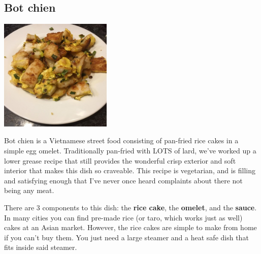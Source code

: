 \documentclass[
]{book}
\begin{document}
\hypertarget{botchien}{%
\subsection*{Bot chien}\label{botchien}}

\includegraphics[width=0.4\textwidth,height=\textheight]{bot_chien_small.jpg}

Bot chien is a Vietnamese street food consisting of pan-fried rice cakes in a simple egg omelet. Traditionally pan-fried with LOTS of lard, we've worked up a lower grease recipe that still provides the wonderful crisp exterior and soft interior that makes this dish so craveable. This recipe is vegetarian, and is filling and satisfying enough that I've never once heard complaints about there not being any meat.

There are 3 components to this dish: the \textbf{rice cake}, the \textbf{omelet}, and the \textbf{sauce}. In many cities you can find pre-made rice (or taro, which works just as well) cakes at an Asian market. However, the rice cakes are simple to make from home if you can't buy them. You just need a large steamer and a heat safe dish that fits inside said steamer.
\end{document}
